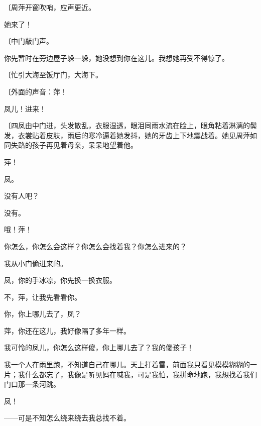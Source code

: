 {\fangsong〔周萍开窗吹哨，应声更近。}

她来了！

{\fangsong〔中门敲门声。}

你先暂时在旁边屋子躲一躲，她没想到你在这儿。我想她再受不得惊了。

{\fangsong〔忙引大海至饭厅门，大海下。}

{\fangsong〔外面的声音：萍！}

凤儿！进来！

{\fangsong〔四凤由中门进，头发散乱，衣服湿透，眼泪同雨水流在脸上，眼角粘着淋漓的鬓发，衣裳贴着皮肤，雨后的寒冷逼着她发抖，她的牙齿上下地震战着。她见周萍如同失路的孩子再见着母亲，呆呆地望着他。}

萍！

凤。

没有人吧？

没有。

哦！萍！

你怎么，你怎么会这样？你怎么会找着我？你怎么进来的？

我从小门偷进来的。

凤，你的手冰凉，你先换一换衣服。

不，萍，让我先看看你。

你，你上哪儿去了，凤？

萍，你还在这儿，我好像隔了多年一样。

我可怜的凤儿，你怎么这样傻，你上哪儿去了？我的傻孩子！

我一个人在雨里跑，不知道自己在哪儿。天上打着雷，前面我只看见模模糊糊的一片；我什么都忘了，我像是听见妈在喊我，可是我怕，我拼命地跑，我想找着我们门口那一条河跳。

凤！

——可是不知怎么绕来绕去我总找不着。

